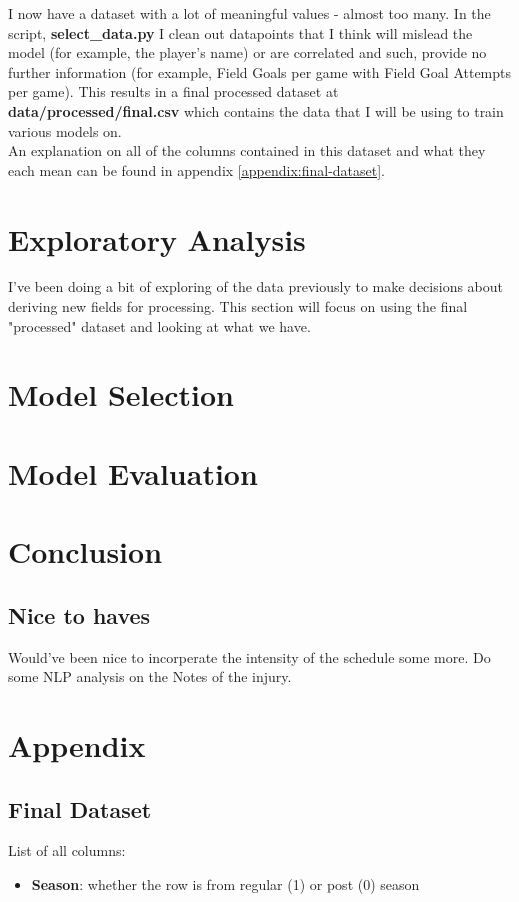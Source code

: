 \documentclass{article}
\begin{document}
I now have a dataset with a lot of meaningful values - almost too many. In the script,
\textbf{select\_data.py} I clean out datapoints that I think will mislead the model (for example, the
player's name) or are correlated and such, provide no further information (for example, Field Goals per game with Field
Goal Attempts per game).
This results in a final processed dataset at \textbf{data/processed/final.csv} which contains the
data that I will be using to train various models on.\\

An explanation on all of the columns contained in this dataset and what they each
mean can be found in appendix \ref{appendix:final-dataset}.

\newpage
\section*{Exploratory Analysis}

I've been doing a bit of exploring of the data previously to
make decisions about deriving new fields for processing.
This section will focus on using the final "processed" dataset
and looking at what we have.

\section*{Model Selection}

\section*{Model Evaluation}

\section*{Conclusion}

\subsection*{Nice to haves}

Would've been nice to incorperate the intensity of the schedule some more.
Do some NLP analysis on the Notes of the injury.

\section*{Appendix}
\label{appendix}

\subsection*{Final Dataset}
\label{appendix:final-dataset}

List of all columns:
\begin{itemize}
    \item \textbf{Season}: whether the row is from regular (1) or post (0) season
\end{itemize}
\end{document}
